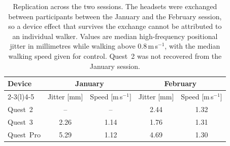 \begin{table}[t]
\caption{Replication across the two sessions. The headsets were exchanged between participants between the January and the February session, so a device effect that survives the exchange cannot be attributed to an individual walker. Values are median high-frequency positional jitter in millimetres while walking above 0.8\,m\,s$^{-1}$, with the median walking speed given for control. Quest~2 was not recovered from the January session.}\label{tab:replication}
\begin{tabular}{lcccc}
\toprule
Device & \multicolumn{2}{c}{January} & \multicolumn{2}{c}{February} \\
\cmidrule(r){2-3}\cmidrule(l){4-5}
 & Jitter [mm] & Speed [m\,s$^{-1}$] & Jitter [mm] & Speed [m\,s$^{-1}$] \\
\midrule
Quest~2 & -- & -- & 2.44 & 1.32 \\
Quest~3 & 2.26 & 1.14 & 1.76 & 1.31 \\
Quest~Pro & 5.29 & 1.12 & 4.69 & 1.30 \\
\bottomrule
\end{tabular}
\end{table}